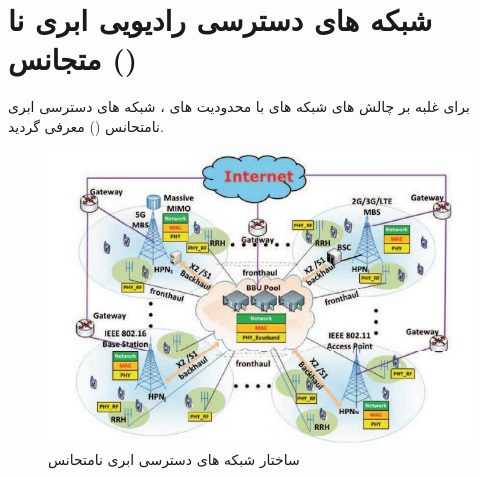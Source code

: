 \section{شبکه های دسترسی رادیویی ابری نا متجانس ()}
برای غلبه بر چالش های شبکه های  با محدودیت های  ، شبکه های دسترسی ابری نامتحانس () معرفی گردید\cite{ fogComputing, heterogeneous, fogEdge}.
\begin{figure}
  \centering
    \includegraphics[scale = 0.8]{hc}
  \caption{ ساختار شبکه های دسترسی ابری نامتحانس \cite{heterogeneous}  }
  \label{fig:hc}
\end{figure}

